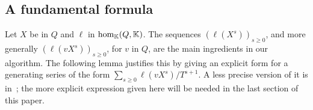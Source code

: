 \documentclass[12pt]{article}
\newcommand{\lf}{X}
\def\K{\mathbb{K}}
\def\K {\ensuremath{\mathbb{K}}}
\begin{document}

\subsection{A fundamental formula}  

Let $\lf$ be in $Q$ and $\ell$ in ${\rm hom}_\K(Q,\K)$.  The sequences
$(\ell(\lf^s))_{s\ge 0}$, and more generally $(\ell(v \lf^s))_{s\ge
  0}$, for $v$ in $Q$, are the main ingredients in our algorithm.  The
following lemma justifies this by giving an explicit form for a
generating series of the form $\sum_{s \ge 0} \ell(v
\lf^s)/T^{s+1}$. A less precise version of it is in~\cite{BoSaSc03};
the more explicit expression given here will be needed in the last
section of this paper.
\end{document}
